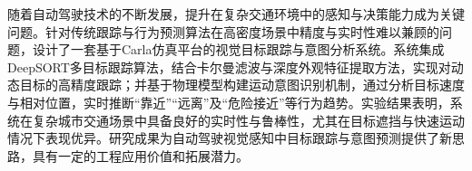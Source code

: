 \begin{abstractzh}

    随着自动驾驶技术的不断发展，提升在复杂交通环境中的感知与决策能力成为关键问题。针对传统跟踪与行为预测算法在高密度场景中精度与实时性难以兼顾的问题，设计了一套基于Carla仿真平台的视觉目标跟踪与意图分析系统。系统集成DeepSORT多目标跟踪算法，结合卡尔曼滤波与深度外观特征提取方法，实现对动态目标的高精度跟踪；并基于物理模型构建运动意图识别机制，通过分析目标速度与相对位置，实时推断“靠近”“远离”及“危险接近”等行为趋势。实验结果表明，系统在复杂城市交通场景中具备良好的实时性与鲁棒性，尤其在目标遮挡与快速运动情况下表现优异。研究成果为自动驾驶视觉感知中目标跟踪与意图预测提供了新思路，具有一定的工程应用价值和拓展潜力。
    

\end{abstractzh}
